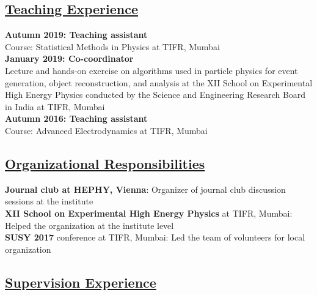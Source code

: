 \documentclass[a4paper,11pt]{article}
\begin{document}
{
\subsection*{\underline{Teaching Experience}}

\textbf{Autumn 2019: Teaching assistant}\\
Course: Statistical Methods in Physics at TIFR, Mumbai \\
\textbf{January 2019: Co-coordinator}\\
Lecture and hands-on exercise on algorithms used in particle physics for event generation, object reconstruction, and analysis
at the XII School on Experimental High Energy Physics conducted by the Science and Engineering Research Board in India at TIFR, Mumbai \\
\textbf{Autumn 2016: Teaching assistant}\\
Course: Advanced Electrodynamics at TIFR, Mumbai

\subsection*{\underline{Organizational Responsibilities}}

\textbf{Journal club at HEPHY, Vienna}: 
Organizer of journal club discussion sessions at the institute\\
\textbf{XII School on Experimental High Energy Physics} at TIFR, Mumbai:
Helped the organization at the institute level\\
\textbf{SUSY 2017} conference at TIFR, Mumbai:
Led the team of volunteers for local organization

\subsection*{\underline{Supervision Experience}}

}
\end{document}
